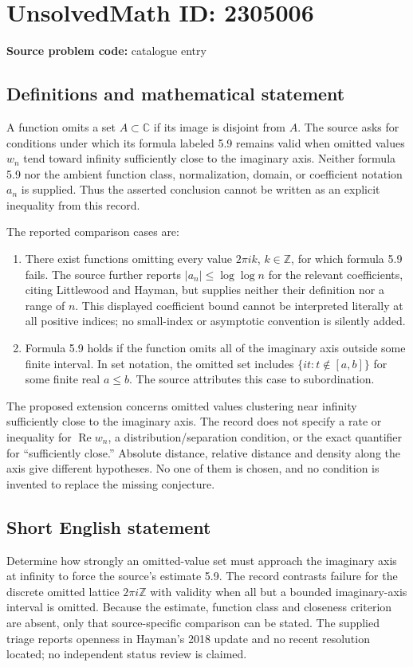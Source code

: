 \documentclass[11pt]{article}
\newcommand{\Z}{\mathbb{Z}}
\newcommand{\C}{\mathbb{C}}
\begin{document}
\section*{UnsolvedMath ID: 2305006}
\textbf{Source problem code:} catalogue entry
\subsection{Definitions and mathematical statement}
A function omits a set $A\subset\C$ if its image is disjoint from $A$. The source asks for conditions under which its formula labeled 5.9 remains valid when omitted values $w_n$ tend toward infinity sufficiently close to the imaginary axis. Neither formula 5.9 nor the ambient function class, normalization, domain, or coefficient notation $a_n$ is supplied. Thus the asserted conclusion cannot be written as an explicit inequality from this record.

The reported comparison cases are:
\begin{enumerate}
\item There exist functions omitting every value $2\pi i k$, $k\in\Z$, for which formula 5.9 fails. The source further reports $|a_n|\leq\log\log n$ for the relevant coefficients, citing Littlewood and Hayman, but supplies neither their definition nor a range of $n$. This displayed coefficient bound cannot be interpreted literally at all positive indices; no small-index or asymptotic convention is silently added.
\item Formula 5.9 holds if the function omits all of the imaginary axis outside some finite interval. In set notation, the omitted set includes $\{it:t\notin[a,b]\}$ for some finite real $a\leq b$. The source attributes this case to subordination.
\end{enumerate}
The proposed extension concerns omitted values clustering near infinity sufficiently close to the imaginary axis. The record does not specify a rate or inequality for $\operatorname{Re}w_n$, a distribution/separation condition, or the exact quantifier for ``sufficiently close.'' Absolute distance, relative distance and density along the axis give different hypotheses. No one of them is chosen, and no condition is invented to replace the missing conjecture.
\subsection{Short English statement}
Determine how strongly an omitted-value set must approach the imaginary axis at infinity to force the source's estimate 5.9. The record contrasts failure for the discrete omitted lattice $2\pi i\Z$ with validity when all but a bounded imaginary-axis interval is omitted. Because the estimate, function class and closeness criterion are absent, only that source-specific comparison can be stated. The supplied triage reports openness in Hayman's 2018 update and no recent resolution located; no independent status review is claimed.
\end{document}
